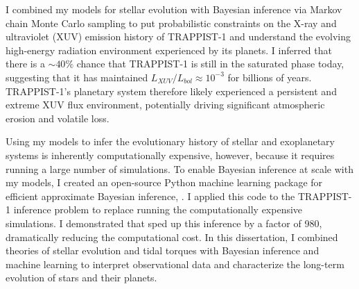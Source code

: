 {I combined my models for stellar evolution with Bayesian inference via Markov chain Monte Carlo sampling to put probabilistic constraints on the X-ray and ultraviolet (XUV) emission history of TRAPPIST-1 and understand the evolving high-energy radiation environment experienced by its planets. I inferred that there is a ${\sim}40\%$ chance that TRAPPIST-1 is still in the saturated phase today, suggesting that it has maintained $L_{XUV}/L_{bol} \approx 10^{-3}$ for billions of years. TRAPPIST-1's planetary system therefore likely experienced a persistent and extreme XUV flux environment, potentially driving significant atmospheric erosion and volatile loss. 

Using my models to infer the evolutionary history of stellar and exoplanetary systems is inherently computationally expensive, however, because it requires running a large number of simulations. To enable Bayesian inference at scale with my models, I created an open-source Python machine learning package for efficient approximate Bayesian inference, \approxposterior. I applied this code to the TRAPPIST-1 inference problem to replace running the computationally expensive \vplanet simulations. I demonstrated that \approxposterior sped up this inference by a factor of 980, dramatically reducing the computational cost.  In this dissertation, I combined theories of stellar evolution and tidal torques with Bayesian inference and machine learning to interpret observational data and characterize the long-term evolution of stars and their planets.}
